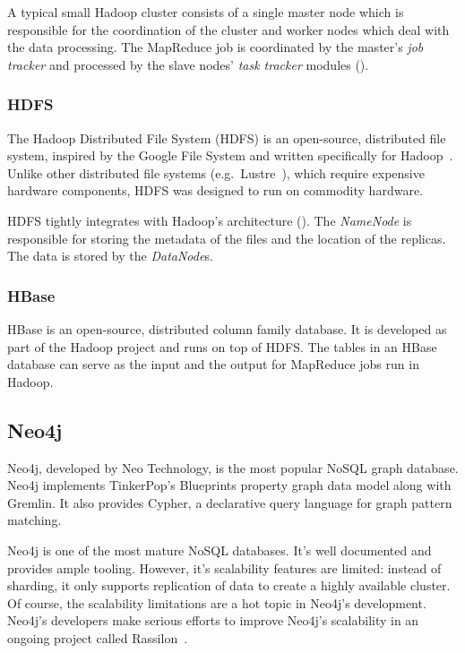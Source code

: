 A typical small Hadoop cluster consists of a single master node which is responsible for the coordination of the cluster and worker nodes which deal with the data processing. The MapReduce job is coordinated by the master's \emph{job tracker} and processed by the slave nodes' \emph{task tracker} modules ().


\subsubsection{HDFS}

The Hadoop Distributed File System (HDFS) is an open-source, distributed file system, inspired by the Google File System and written specifically for Hadoop~\cite{Hadoop}. Unlike other distributed file systems (e.g.\ Lustre~\cite{Lustre}), which require expensive hardware components, HDFS was designed to run on commodity hardware.

HDFS tightly integrates with Hadoop's architecture (). The \emph{NameNode} is responsible for storing the metadata of the files and the location of the replicas. The data is stored by the \emph{DataNode}s.


\subsubsection{HBase}

HBase is an open-source, distributed column family database. It is developed as part of the Hadoop project and runs on top of HDFS. The tables in an HBase database can serve as the input and the output for MapReduce jobs run in Hadoop.

\subsection{Neo4j}
\label{subsec:neo4j}

Neo4j, developed by Neo Technology, is the most popular NoSQL graph database. Neo4j implements TinkerPop's Blueprints property graph data model along with Gremlin. It also provides Cypher, a declarative query language for graph pattern matching. 

Neo4j is one of the most mature NoSQL databases. It's well documented and provides ample tooling. However, it's scalability features are limited: instead of sharding, it only supports replication of data to create a highly available cluster. Of course, the scalability limitations are a hot topic in Neo4j's development. Neo4j's developers make serious efforts to improve Neo4j's scalability in an ongoing project called Rassilon~\cite{rassilon}.

